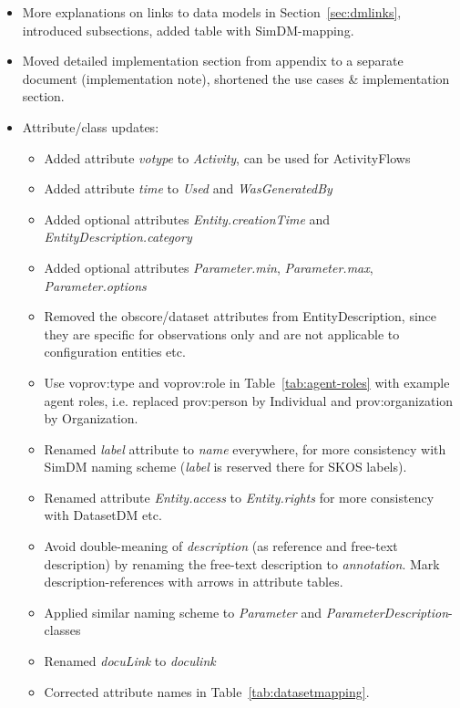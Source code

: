 \documentclass[11pt,a4paper]{ivoa}
\newcommand{\class}[1]{\emph{#1}}
\begin{document}
\begin{appendices}
\begin{itemize}
\item More explanations on links to data models in Section~\ref{sec:dmlinks}, introduced subsections, added table with SimDM-mapping.
\item Moved detailed implementation section from appendix to a separate document (implementation note), shortened the use cases \& implementation section.
\item Attribute/class updates:
\begin{itemize}
    \item Added attribute \emph{votype} to \class{Activity}, can be used for ActivityFlows
    \item Added attribute \emph{time} to \class{Used} and \class{WasGeneratedBy}
    \item Added optional attributes \emph{Entity.creationTime} and \emph{EntityDescription.category}
    \item Added optional attributes \emph{Parameter.min},  \emph{Parameter.max},  \emph{Parameter.options}
    \item Removed the obscore/dataset attributes from EntityDescription, since they are specific for observations only and are not applicable to configuration entities etc.
    \item Use voprov:type and voprov:role in Table~\ref{tab:agent-roles} with example agent roles, i.e. replaced prov:person by Individual and prov:organization by Organization.
    \item Renamed \emph{label} attribute to \emph{name} everywhere, for more consistency with SimDM naming scheme (\emph{label} is reserved there for SKOS labels).
    \item Renamed attribute \emph{Entity.access} to \emph{Entity.rights} for more consistency with DatasetDM etc.
    \item Avoid double-meaning of \emph{description} (as reference and free-text description) by renaming the free-text description to \emph{annotation}. Mark description-references with arrows in attribute tables.
    \item Applied similar naming scheme to \emph{Parameter} and \emph{ParameterDescription}-classes
    \item Renamed \emph{docuLink} to \emph{doculink}
    \item Corrected attribute names in Table~\ref{tab:datasetmapping}.
\end{itemize}


\end{itemize}

\end{appendices}

\listoffigures

\listoftables


\end{document}
